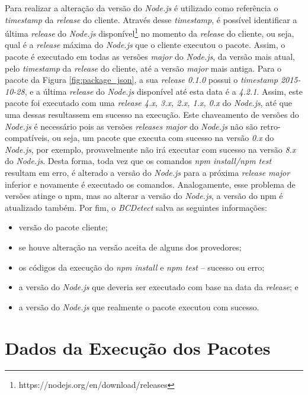 Para realizar a alteração da versão do \textit{Node.js} é utilizado como referência o \textit{timestamp} da \textit{release} do cliente. Através desse \textit{timestamp}, é possível identificar a última \textit{release} do \textit{Node.js} disponível\footnote{https://nodejs.org/en/download/releases} no momento da \textit{release} do cliente, ou seja, qual é a \textit{release} máxima do \textit{Node.js} que o cliente executou o pacote. Assim, o pacote é executado em todas as versões \textit{major} do \textit{Node.js}, da versão mais atual, pelo \textit{timestamp} da \textit{release} do cliente, até a versão \textit{major} mais antiga. Para o pacote da Figura \ref{fig:package_json}, a sua \textit{release 0.1.0} possui o \textit{timestamp 2015-10-28}, e a última \textit{release} do \textit{Node.js} disponível até esta data é a \textit{4.2.1}. Assim, este pacote foi executado com uma \textit{release 4.x, 3.x, 2.x, 1.x, 0.x} do \textit{Node.js}, até que uma dessas resultassem em sucesso na execução. Este chaveamento de versões do \textit{Node.js} é necessário pois as versões \textit{releases major} do \textit{Node.js} não são retro-compatíveis, ou seja, um pacote que executa com sucesso na versão \textit{0.x} do \textit{Node.js}, por exemplo, provavelmente não irá executar com sucesso na versão \textit{8.x} do \textit{Node.js}. Desta forma, toda vez que os comandos \textit{npm install/npm test} resultam em erro, é alterado a versão do \textit{Node.js} para a próxima \textit{release major} inferior e novamente é executado os comandos. Analogamente, esse problema de versões atinge o \gls{npm}, mas ao alterar a versão do \textit{Node.js}, a versão do \gls{npm} é atualizado também. Por fim, o \textit{BCDetect} salva as seguintes informações:

\begin{itemize}
    \item versão do pacote cliente;
    \item se houve alteração na versão aceita de alguns dos provedores;
    \item os códigos da execução do \textit{npm install} e \textit{npm test} -- sucesso ou erro;
    \item a versão do \textit{Node.js} que deveria ser executado com base na data da \textit{release}; e
    \item a versão do \textit{Node.js} que realmente o pacote executou com sucesso.
\end{itemize}{}

\section{Dados da Execução dos Pacotes}
\label{sec:col_dados}

